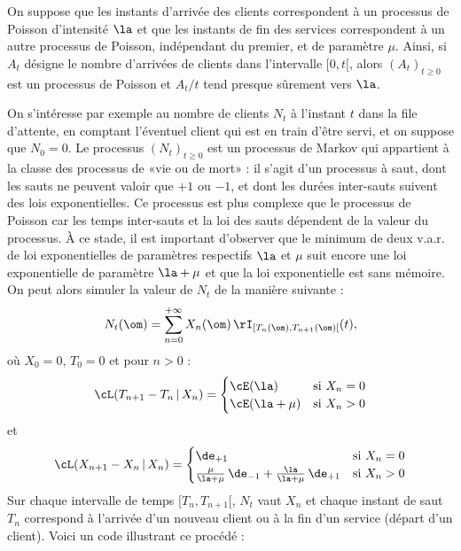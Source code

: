 {{On suppose que les instants d'arrivée des clients correspondent à un processus
de Poisson d'intensité $\la$ et que les instants de fin des services
correspondent à un autre processus de Poisson, indépendant du premier, et de
paramètre $\mu$.  Ainsi, si $A_t$ désigne le nombre d'arrivées de clients dans
l'intervalle $[0,t[$, alors $(A_t)_{t\geq 0}$ est un processus de Poisson et
$A_t/t$ tend presque sûrement vers $\la$.

On s'intéresse par exemple au nombre de clients $N_t$ à l'instant $t$ dans la
file d'attente, en comptant l'éventuel client qui est en train d'être servi,
et on suppose que $N_0=0$. Le processus $(N_t)_{t\geq0}$ est un processus de
Markov qui appartient à la classe des processus de «vie ou de mort» : il
s'agit d'un processus à saut, dont les sauts ne peuvent valoir que $+1$ ou
$-1$, et dont les durées inter-sauts suivent des lois exponentielles. Ce
processus est plus complexe que le processus de Poisson car les temps
inter-sauts et la loi des sauts dépendent de la valeur du processus. À ce
stade, il est important d'observer que le minimum de deux v.a.r. de loi
exponentielles de paramètres respectifs $\la$ et $\mu$ suit encore une loi
exponentielle de paramètre $\la+\mu$ et que la loi exponentielle est sans
mémoire.  On peut alors simuler la valeur de $N_t$ de la manière suivante :
$$
N_t(\om)=\sum_{n=0}^{+\infty} X_n(\om)
\,\rI_{[T_n(\om),T_{n+1}(\om)[}(t),
$$
où $X_0=0$, $T_0=0$ et pour $n>0$ :
$$
\cL(T_{n+1}-T_{n}\,\vert\,X_n)=
\begin{cases}
\cE(\la) & \text{si $X_n=0$} \\
\cE(\la+\mu) & \text{si $X_n>0$}
\end{cases}
$$
et 
$$
\cL(X_{n+1}-X_n\,\vert\,X_n)=
\begin{cases}
\de_{+1} & \text{si $X_n=0$} \\
\frac{\mu}{\la+\mu}\,\de_{-1}+\frac{\la}{\la+\mu}\,\de_{+1} & \text{si $X_n>0$}
\end{cases}
$$
Sur chaque intervalle de temps $[T_n,T_{n+1}[$, $N_t$ vaut $X_n$ et chaque
instant de saut $T_n$ correspond à l'arrivée d'un nouveau client ou à la fin
d'un service (départ d'un client). Voici un code \ML{} illustrant ce procédé :


}}
